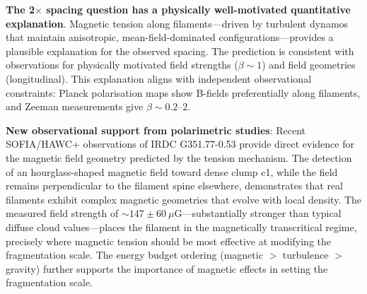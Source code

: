 \documentclass[11pt,a4paper]{article}
\begin{document}

\textbf{The 2$\times$ spacing question has a physically well-motivated quantitative explanation}. Magnetic tension along filaments—driven by turbulent dynamos that maintain anisotropic, mean-field-dominated configurations—provides a plausible explanation for the observed spacing. The prediction is consistent with observations for physically motivated field strengths ($\beta \sim 1$) and field geometries (longitudinal). This explanation aligns with independent observational constraints: Planck polarisation maps show B-fields preferentially along filaments, and Zeeman measurements give $\beta \sim 0.2$--$2$.

\textbf{New observational support from polarimetric studies}: Recent SOFIA/HAWC+ observations of IRDC G351.77-0.53 \citep{Jadhav2026} provide direct evidence for the magnetic field geometry predicted by the tension mechanism. The detection of an hourglass-shaped magnetic field toward dense clump c1, while the field remains perpendicular to the filament spine elsewhere, demonstrates that real filaments exhibit complex magnetic geometries that evolve with local density. The measured field strength of $\sim147 ~\mu$G—substantially stronger than typical diffuse cloud values—places the filament in the magnetically transcritical regime, precisely where magnetic tension should be most effective at modifying the fragmentation scale. The energy budget ordering (magnetic $>$ turbulence $>$ gravity) further supports the importance of magnetic effects in setting the fragmentation scale.
\end{document}
